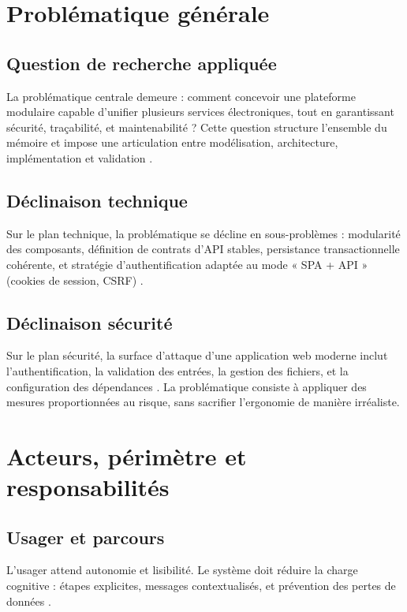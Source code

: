 \section{Problématique générale}

\subsection{Question de recherche appliquée}

La problématique centrale demeure : comment concevoir une plateforme modulaire capable d'unifier plusieurs services électroniques, tout en garantissant sécurité, traçabilité, et maintenabilité ? Cette question structure l'ensemble du mémoire et impose une articulation entre modélisation, architecture, implémentation et validation \cite{sommerville2016}.

\subsection{Déclinaison technique}

Sur le plan technique, la problématique se décline en sous-problèmes : modularité des composants, définition de contrats d'API stables, persistance transactionnelle cohérente, et stratégie d'authentification adaptée au mode « SPA + API » (cookies de session, CSRF) \cite{sanctumdoc,laraveldoc,reactdoc}.

\subsection{Déclinaison sécurité}

Sur le plan sécurité, la surface d'attaque d'une application web moderne inclut l'authentification, la validation des entrées, la gestion des fichiers, et la configuration des dépendances \cite{owasp2021}. La problématique consiste à appliquer des mesures proportionnées au risque, sans sacrifier l'ergonomie de manière irréaliste.

\section{Acteurs, périmètre et responsabilités}

\subsection{Usager et parcours}

L'usager attend autonomie et lisibilité. Le système doit réduire la charge cognitive : étapes explicites, messages contextualisés, et prévention des pertes de données \cite{pressman2014}.

